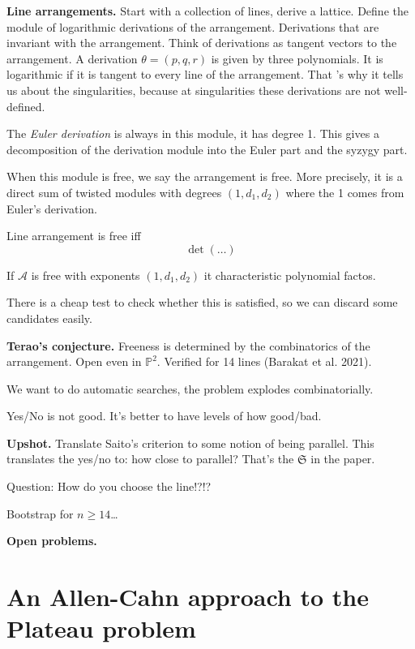 \medskip\noindent
{\bf Line arrangements.}
Start with a collection of lines,
derive a lattice.
Define the module of logarithmic
derivations of the arrangement.
Derivations that are invariant with the
arrangement. Think of derivations
as tangent vectors to the arrangement.
A derivation  $\theta=(p,q,r)$ is given
by three polynomials. It is logarithmic
if it is tangent to every line of the
arrangement. That 's why it tells us about
the singularities, because at singularities
these derivations are not well-defined.

The {\it Euler derivation} is always
in this module, it has degree 1.
This gives a decomposition of the derivation
module into the Euler part and the
syzygy part.

When this module is free, we say the
arrangement is free. More precisely,
it is a direct sum of twisted modules
with degrees $(1,d_1,d_2)$ where the
1 comes from Euler's derivation.

\begin{theorem}[Saito, 80]
\label{theorem-saito}
Line arrangement is free iff
$$
\det(…)
$$

\end{theorem}

\begin{theorem}[Terao 1982]
\label{theorem-terao}
If $\mathcal{A}$ is free with exponents
$(1,d_1,d_2)$ it characteristic
polynomial factos.
\end{theorem}

\noindent
There is a cheap test to check whether
this is satisfied, so we can discard
some candidates easily.

\noindent
{\bf Terao's conjecture.} 
Freeness is determined by the combinatorics
of the arrangement.
Open even in $\mathbb{P}^2$. Verified for
14 lines (Barakat et al. 2021).

We want to do automatic searches, the
problem explodes combinatorially.

Yes/No is not good. It's better to have
levels of how good/bad.

{\bf Upshot.} Translate Saito's criterion
to some notion of being parallel. This
translates the yes/no to: how close to
parallel? That's the $\mathfrak{S}$ in the
paper.

Question: How do you choose the line!?!?

Bootstrap for $n \geq  14$…

\medskip\noindent
{\bf Open problems.}



\section{An Allen-Cahn approach to the
Plateau problem}
\label{section-allen-cahn-plateau}

